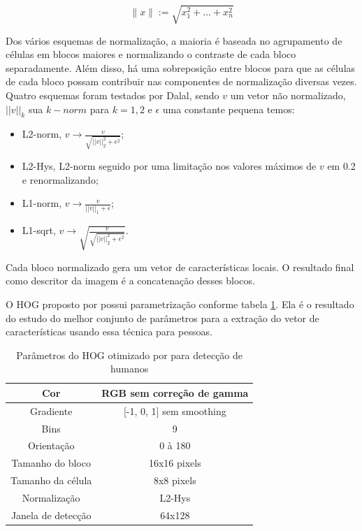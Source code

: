 \[\|x\| := \sqrt{x_1^2 + ... + x_n^2}\]

Dos vários esquemas de normalização, a maioria é baseada no agrupamento de células em blocos maiores e normalizando o contraste de cada bloco separadamente. Além disso, há uma sobreposição entre blocos para que as células de cada bloco possam contribuir nas componentes de normalização diversas vezes. Quatro esquemas foram testados por Dalal, sendo \(v\) um vetor não normalizado, \(||v||_k\) sua \(k-norm\) para \(k=1,2\) e \(\epsilon\) uma constante pequena temos:

\begin{itemize}
\item L2-norm, \(v \to \frac{v}{\sqrt{||v||_2^2 + \epsilon^2}}\);
\item L2-Hys, L2-norm seguido por uma limitação nos valores máximos de \(v\) em 0.2 e renormalizando; 
\item L1-norm, \(v \to \frac{v}{||v||_1 + \epsilon}\);
\item L1-sqrt, \(v \to \sqrt{\frac{v}{\sqrt{||v||_2^2 + \epsilon^2}}}\).
\end{itemize}

Cada bloco normalizado gera um vetor de características locais. O resultado final como descritor da imagem é a concatenação desses blocos.

O HOG proposto por  possui parametrização conforme tabela \ref{table:dlal_hog}. Ela é o resultado do estudo do melhor conjunto de parâmetros para a extração do vetor de características usando essa técnica para pessoas. 

\begin{table}[!h]
\centering
\begin{tabular}{|c|c|}
\hline Cor & RGB sem correção de gamma \\ 
\hline Gradiente & [-1, 0, 1] sem smoothing \\ 
\hline Bins & 9 \\
\hline Orientação & 0 à 180 \\
\hline Tamanho do bloco & 16x16 pixels \\
\hline Tamanho da célula & 8x8 pixels \\
\hline Normalização & L2-Hys \\
\hline Janela de detecção & 64x128 \\
\hline 
\end{tabular} 
\caption{Parâmetros do HOG otimizado por  para detecção de humanos}
\label{table:dlal_hog}
\end{table}

